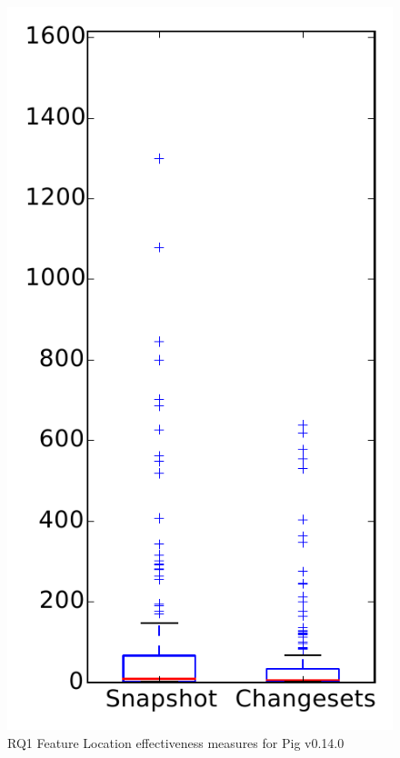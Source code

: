 
\begin{figure}
\centering
\includegraphics[height=0.4\textheight]{figures/flt/rq1_pig}
\caption{RQ1 Feature Location effectiveness measures for Pig v0.14.0}
\label{fig:flt:rq1:pig}
\end{figure}
